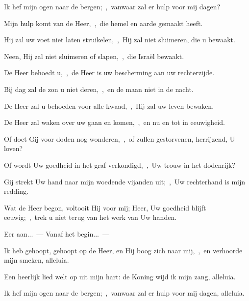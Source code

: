\documentclass[12pt,twoside,a5paper]{article}
\begin{document}
\begin{halfparskip}
  Ik hef mijn ogen naar de bergen;~\sep\ vanwaar zal er hulp voor mij dagen?

  Mijn hulp komt van de Heer,~\sep\ die hemel en aarde gemaakt heeft.

  Hij zal uw voet niet laten struikelen,~\sep\ Hij zal niet sluimeren, die u bewaakt.

  Neen, Hij zal niet sluimeren of slapen,~\sep\ die Israël bewaakt.

  De Heer behoedt u,~\sep\ de Heer is uw bescherming aan uw rechterzijde.

  Bij dag zal de zon u niet deren,~\sep\ en de maan niet in de nacht.

  De Heer zal u behoeden voor alle kwaad,~\sep\ Hij zal uw leven bewaken.

  De Heer zal waken over uw gaan en komen,~\sep\ en nu en tot in eeuwigheid.

   Of doet Gij voor doden nog wonderen,~\sep\ of zullen gestorvenen, herrijzend, U loven?

  Of wordt Uw goedheid in het graf verkondigd,~\sep\ Uw trouw in het dodenrijk?

   Gij strekt Uw hand naar mijn woedende vijanden uit;~\sep\ Uw rechterhand is mijn redding.

  Wat de Heer begon, voltooit Hij voor mij; Heer, Uw goedheid blijft eeuwig;~\sep\ trek u niet terug van het werk van Uw handen.

  Eer aan...~---  Vanaf het begin...~--- 

   Ik heb gehoopt, gehoopt op de Heer, en Hij boog zich naar mij,~\sep\ en verhoorde mijn smeken, alleluia.

   Een heerlijk lied welt op uit mijn hart: de Koning wijd ik mijn zang, alleluia.

   Ik hef mijn ogen naar de bergen;~\sep\ vanwaar zal er hulp voor mij dagen, alleluia.
\end{halfparskip}

\end{document}
